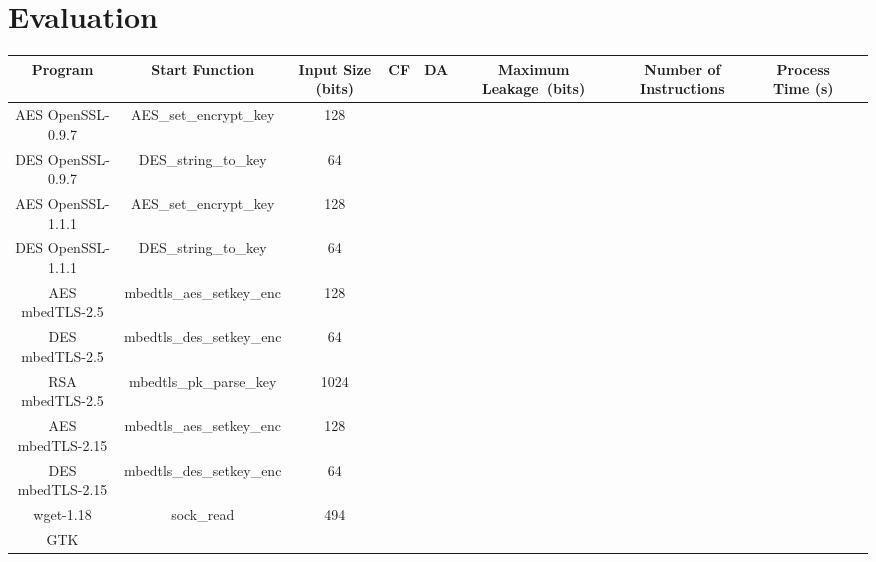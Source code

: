 \section{Evaluation}
\label{res_overview}
\begin{table*}[h]
    \begin{tabular}{c c c c c c c c l}
    \hline
    Program                & Start Function             & Input Size (bits)   & CF   & DA     & Maximum Leakage (bits)& Number of Instructions & Process Time (s) \\ \hline
    AES OpenSSL-0.9.7      & AES\_set\_encrypt\_key     &     128             &      &        &                       &                        &                  \\
    DES OpenSSL-0.9.7      & DES\_string\_to\_key       &     64              &      &        &                       &                        &                  \\
    AES OpenSSL-1.1.1      & AES\_set\_encrypt\_key     &     128             &      &        &                       &                        &                  \\
    DES OpenSSL-1.1.1      & DES\_string\_to\_key       &     64              &      &        &                       &                        &                  \\
    AES mbedTLS-2.5        & mbedtls\_aes\_setkey\_enc	&     128             &      &        &                       &                        &                  \\
    DES mbedTLS-2.5        & mbedtls\_des\_setkey\_enc  &     64              &      &        &                       &                        &                  \\
    RSA mbedTLS-2.5        & mbedtls\_pk\_parse\_key    &     1024            &      &        &                       &                        &                  \\
    AES mbedTLS-2.15       & mbedtls\_aes\_setkey\_enc  &     128             &      &        &                       &                        &                  \\
    DES mbedTLS-2.15       & mbedtls\_des\_setkey\_enc  &     64              &      &        &                       &                        &                  \\
    wget-1.18              & sock\_read                 &     494             &      &        &                       &                        &                  \\
    GTK                    &                            &                     &      &        &                       &                        &                  \\
    \hline
    \end{tabular}
\end{table*}
